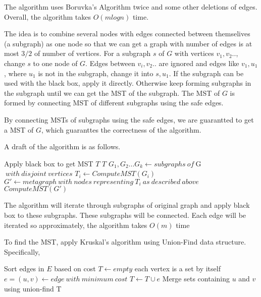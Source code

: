 \documentclass[12pt,a4paper]{article}
\newcommand{\question}[1]{\bigskip\noindent{\textbf{Q{#1} solution}}}
\begin{document}
The algorithm uses Boruvka's Algorithm twice and some other deletions of edges. Overall, the algorithm takes $O(mlogn)$ time.

\question{29.B}

The idea is to combine several nodes with edges connected between themselives (a subgraph) as one node so that we can get a graph with number of edges is at most $3/2$ of number of vertices. For a subgraph $s$ of $G$ with vertices $v_1,v_2..$, change $s$ to one node of $G$. Edges between $v_i,v_2..$ are ignored and edges like ${v_1,u_1}$, where $u_1$ is not in the subgraph, change it into ${s,u_1}$. If the subgraph can be used with the black box, apply it directly. Otherwise keep forming subgraphs in the subgraph until we can get the MST of the subgraph. The MST of $G$ is formed by connecting MST of different subgraphs using the safe edges. 

By connecting MSTs of subgraphs using the safe edges, we are guarantted to get a MST of $G$, which guaranttes the correctness of the algorithm.

A draft of the algorithm is as follows. 


\begin{algorithm}
  \begin{algorithmic}
        \State Apply black box to get MST $T$
        \State \Return $T$
      \EndIf
      \State $G_1,G_2...G_k \gets subgraphs\ of\ $G$\ with\ disjoint\ vertices$
        \State $T_i \gets ComputeMST(G_i)$
      \EndFor
      \State $G' \gets metagraph\ with\ nodes\ representing\ T_i\ as\ described\ above$
      \State \Return $ComputeMST(G')$
    \EndFunction
  \end{algorithmic}
\end{algorithm}

The algorithm will iterate through subgraphs of original graph and apply black box to these subgraphs. These subgraphs will be connected. Each edge will be iterated so approximately, the algorithm takes $O(m)$ time


\question{29.C}

To find the MST, apply Kruskal's algorithm using Union-Find data structure. Specifically, 

\begin{algorithm}
  \begin{algorithmic}
    \State Sort edges in $E$ based on cost 
    \State $T \gets empty$
    \State each vertex is a set by itself
      \State $e = (u,v) \gets edge\ with\ minimum\ cost$
        \State $T \gets T \cup e$
        \State Merge sets containing $u$ and $v$ using union-find
      \EndIf
    \EndWhile
    \State \Return T
    \EndFunction
  \end{algorithmic}
\end{algorithm}
\end{document}
